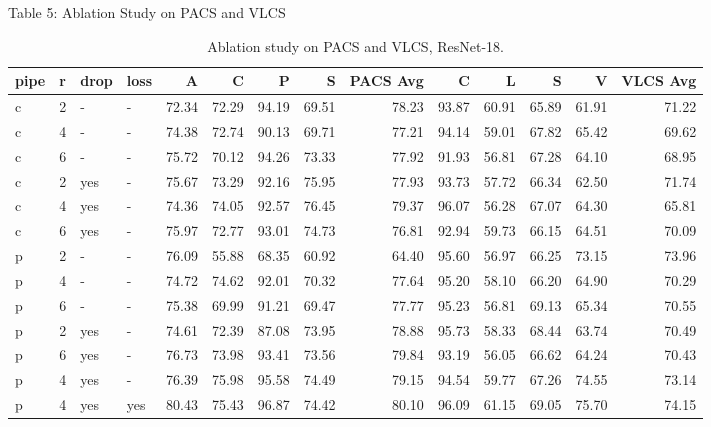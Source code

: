\documentclass[t, aspectratio=169]{beamer} %
\begin{document}
	\begin{frame}{Table 5: Ablation Study on PACS and VLCS}
\begin{table}[htbp]
\centering
\caption{Ablation study on PACS and VLCS, ResNet-18.}
\tiny
\begin{adjustbox}{max width=\textwidth,max totalheight=0.72\textheight,keepaspectratio}
\begin{tabular}{llllrrrrrrrrrr}
\toprule
pipe & r & drop & loss & A & C & P & S & PACS Avg & C & L & S & V & VLCS Avg \\
\midrule
c & 2 & - & - & 72.34 & 72.29 & 94.19 & 69.51 & 78.23 & 93.87 & 60.91 & 65.89 & 61.91 & 71.22 \\
c & 4 & - & - & 74.38 & 72.74 & 90.13 & 69.71 & 77.21 & 94.14 & 59.01 & 67.82 & 65.42 & 69.62 \\
c & 6 & - & - & 75.72 & 70.12 & 94.26 & 73.33 & 77.92 & 91.93 & 56.81 & 67.28 & 64.10 & 68.95 \\
c & 2 & yes & - & 75.67 & 73.29 & 92.16 & 75.95 & 77.93 & 93.73 & 57.72 & 66.34 & 62.50 & 71.74 \\
c & 4 & yes & - & 74.36 & 74.05 & 92.57 & 76.45 & 79.37 & 96.07 & 56.28 & 67.07 & 64.30 & 65.81 \\
c & 6 & yes & - & 75.97 & 72.77 & 93.01 & 74.73 & 76.81 & 92.94 & 59.73 & 66.15 & 64.51 & 70.09 \\
p & 2 & - & - & 76.09 & 55.88 & 68.35 & 60.92 & 64.40 & 95.60 & 56.97 & 66.25 & 73.15 & 73.96 \\
p & 4 & - & - & 74.72 & 74.62 & 92.01 & 70.32 & 77.64 & 95.20 & 58.10 & 66.20 & 64.90 & 70.29 \\
p & 6 & - & - & 75.38 & 69.99 & 91.21 & 69.47 & 77.77 & 95.23 & 56.81 & 69.13 & 65.34 & 70.55 \\
p & 2 & yes & - & 74.61 & 72.39 & 87.08 & 73.95 & 78.88 & 95.73 & 58.33 & 68.44 & 63.74 & 70.49 \\
p & 6 & yes & - & 76.73 & 73.98 & 93.41 & 73.56 & 79.84 & 93.19 & 56.05 & 66.62 & 64.24 & 70.43 \\
p & 4 & yes & - & 76.39 & 75.98 & 95.58 & 74.49 & 79.15 & 94.54 & 59.77 & 67.26 & 74.55 & 73.14 \\
p & 4 & yes & yes & 80.43 & 75.43 & 96.87 & 74.42 & 80.10 & 96.09 & 61.15 & 69.05 & 75.70 & 74.15 \\
\bottomrule
\end{tabular}
\end{adjustbox}
\end{table}
	\end{frame}
\end{document}
